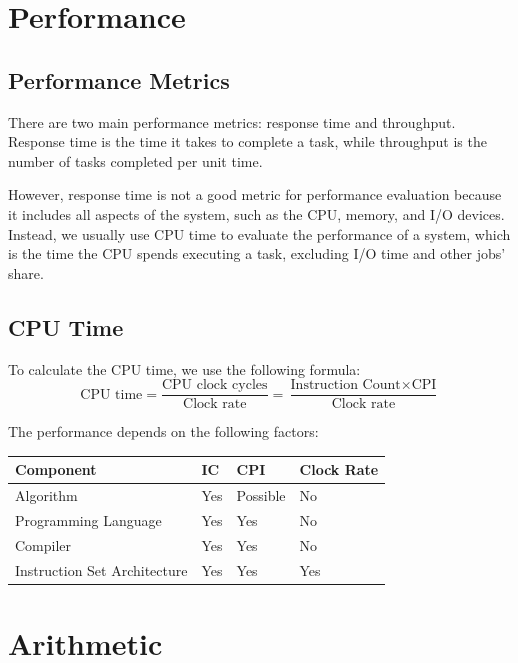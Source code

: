 \documentclass[a4paper,12pt]{article}
\begin{document}
\section{Performance}

\subsection{Performance Metrics}

There are two main performance metrics: response time and throughput. Response time is the time it takes to complete a task, while throughput is the number of tasks completed per unit time.

However, response time is not a good metric for performance evaluation because it includes all aspects of the system, such as the CPU, memory, and I/O devices. Instead, we usually use CPU time to evaluate the performance of a system, which is the time the CPU spends executing a task, excluding I/O time and other jobs' share.

\subsection{CPU Time}

To calculate the CPU time, we use the following formula:
\begin{equation*}
	\text{CPU time} = \frac{\text{CPU clock cycles}}{\text{Clock rate}} = \frac{\text{Instruction Count} \times \text{CPI}}{\text{Clock rate}}
\end{equation*}

The performance depends on the following factors:
\begin{table}[H]
	\centering
	\begin{tabular}{llll}
		\toprule
		\textbf{Component} & \textbf{IC} & \textbf{CPI} & \textbf{Clock Rate} \\
		\midrule
		Algorithm & Yes & Possible & No \\
		Programming Language & Yes & Yes & No \\
		Compiler & Yes & Yes & No \\
		Instruction Set Architecture & Yes & Yes & Yes \\
		\bottomrule
	\end{tabular}	
\end{table}

\section{Arithmetic}
\end{document}
